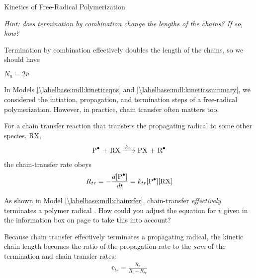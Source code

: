 \begin{activity}{Kinetics of Free-Radical Polymerization}
\begin{ctqs}
\begin{enumerate}
				\emph{Hint: does termination by combination change the lengths of the chains?  If so, how?}
				
				\begin{solution}[0.75in]
					Termination by combination effectively doubles the length of the chains, so we should have 
					
					$N_n = 2\bar v$
				\end{solution}
		
		\end{enumerate}

\end{ctqs}

		
\clearpage
\begin{model}
\label{\labelbase:mdl:chainxfer}

	In Models \ref{\labelbase:mdl:kineticeqns} and \ref{\labelbase:mdl:kineticssummary}, we considered the intiation, propagation, and termination steps of a free-radical polymerization.  However, in practice, chain transfer often matters too.
	
	For a chain transfer reaction that transfers the propagating radical to some other species, RX,
	\begin{align*}
		\text{\ce{P^.} + RX} \xlongrightarrow{k_{tr}} \text{PX + \ce{R^.}}
	\end{align*}
	the chain-transfer rate obeys
	\begin{align*}
		R_{tr} = -\frac{d[\text{\ce{P^.}}]}{dt} = k_{tr}\text{[\ce{P^.}][RX]}
	\end{align*}
	
\end{model}

\begin{ctqs}
	\question As shown in Model \ref{\labelbase:mdl:chainxfer}, chain-transfer \emph{effectively} terminates a polymer radical .
		How could you adjust the equation for $\bar v$ given in the information box on page \pageref{\labelbase:infobox:kineticchainlength} to take this into account?
		
		\begin{solution}[2in]
	
			Because chain transfer effectively terminates a propagating radical, the kinetic chain length becomes the ratio of the propagation rate to the \emph{sum} of the termination and chain transfer rates:
			\begin{align*}
				\bar v_{tr} = \frac{R_p}{R_t + R_{tr}}
			\end{align*}
	

\end{solution}
\end{ctqs}
\end{activity}
